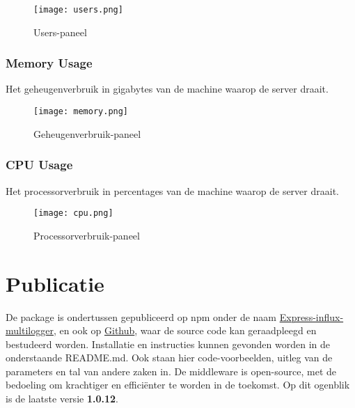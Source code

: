 \begin{figure}[h!]
	\centering
	\texttt{[image: users.png]}
	\caption{Users-paneel}
	\label{fig:users}
\end{figure}

\subsubsection{Memory Usage}
\label{sec:memory}
Het geheugenverbruik in gigabytes van de machine waarop de server draait.
\begin{figure}[h!]
	\centering
	\texttt{[image: memory.png]}
	\caption{Geheugenverbruik-paneel}
	\label{fig:mem}
\end{figure}

\subsubsection{CPU Usage}
\label{sec:cpu}
Het processorverbruik in percentages van de machine waarop de server draait.

\begin{figure}[h!]
	\centering
	\texttt{[image: cpu.png]}
	\caption{Processorverbruik-paneel}
	\label{fig:cpu}
\end{figure}

\section{Publicatie}
\label{sec:publication}

De package is ondertussen gepubliceerd op npm onder de naam \href{https://www.npmjs.com/package/express-influx-multilogger}{Express-influx-multilogger,} en ook op \href{https://github.com/LeunensMichiel/express-influx-multilogger}{Github}, waar de source code kan geraadpleegd en bestudeerd worden. Installatie en instructies kunnen gevonden worden in de onderstaande README.md. Ook staan hier code-voorbeelden, uitleg van de parameters en tal van andere zaken in. De middleware is open-source, met de bedoeling om krachtiger en efficiënter te worden in de toekomst. Op dit ogenblik is de laatste versie \textbf{1.0.12}.


 
